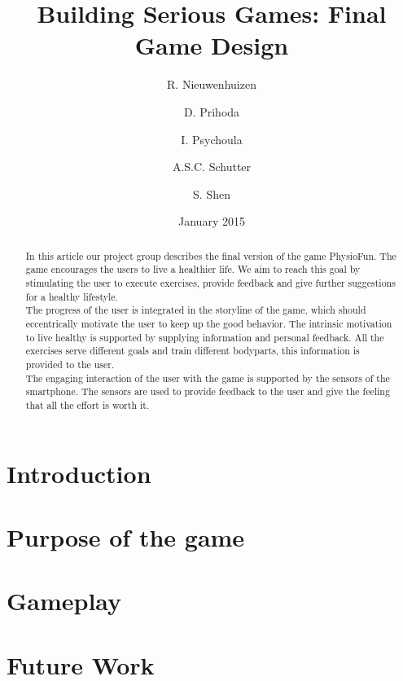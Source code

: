 \documentclass[a4paper]{article}
\title{Building Serious Games: Final Game Design}
\author{
	R. Nieuwenhuizen \and
    D. Prihoda  \and
	I. Psychoula \and
	A.S.C. Schutter \and
	S. Shen
 }
\date{January 2015}
\begin{document}
\maketitle

\begin{abstract}
In this article our project group describes the final version of the game PhysioFun. The game encourages the users to live a healthier life. We aim to reach this goal by stimulating the user to execute exercises, provide feedback and give further suggestions for a healthy lifestyle. \\
The progress of the user is integrated in the storyline of the game, which should eccentrically motivate the user to keep up the good behavior. The intrinsic motivation to live healthy is supported by supplying information and personal feedback. All the exercises serve different goals and train different bodyparts, this information is provided to the user.  \\
The engaging interaction of the user with the game is supported by the sensors of the smartphone. The sensors are used to provide feedback to the user and give the feeling that all the effort is worth it.
\end{abstract}

\section{Introduction}


\section{Purpose of the game}
\label{chap:GamePurpose}


\section{Gameplay}


\section{Future Work}
\label{sec:FutureWork}

\end{document}
